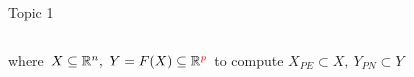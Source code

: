 \documentclass[10pt,xcolor=dvipsnames]{beamer}
\newcommand{\mR}{\mathbb{R}}
\newcommand{\red}{\textcolor{red}}
\begin{document}
\begin{frame}{Topic 1}
\begin{columns}
\begin{column}{0.425\textwidth}
{\vspace{1mm}
\noindent 
where
$
%
X \subseteq\mR^n, \
Y=F(X)\subseteq \mR^{\red{p}}
%
$
\color{blue}
\vspace{1.5mm}
to compute
$
%
X_{PE} \subset X, \
Y_{PN}\subset Y
%
$
\color{black}
}
\end{column}
\begin{column}{0.42\textwidth}
$\mbox{ }$\ 
\end{column}
\end{columns}

\end{frame}
\end{document}
